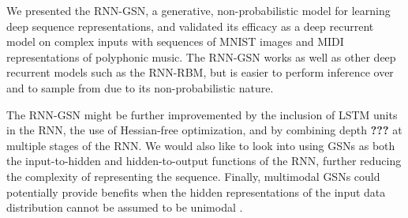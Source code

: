 We presented the RNN-GSN, a generative, non-probabilistic model for learning deep sequence representations, and validated its efficacy as a deep recurrent model on complex inputs with sequences of MNIST images and MIDI representations of polyphonic music. The RNN-GSN works as well as other deep recurrent models such as the RNN-RBM, but is easier  to perform inference over and to sample from due to its non-probabilistic nature.

The RNN-GSN might be further improvemented by the inclusion of LSTM units in the RNN, the use of Hessian-free optimization, and by combining depth {\bf ???} at multiple stages of the RNN. We would also like to look into using GSNs as both the input-to-hidden and hidden-to-output functions of the RNN, further reducing the complexity of representing the sequence. Finally, multimodal GSNs could potentially provide benefits when the hidden representations of the input data distribution cannot be assumed to be unimodal \cite{multi_gsn}.

